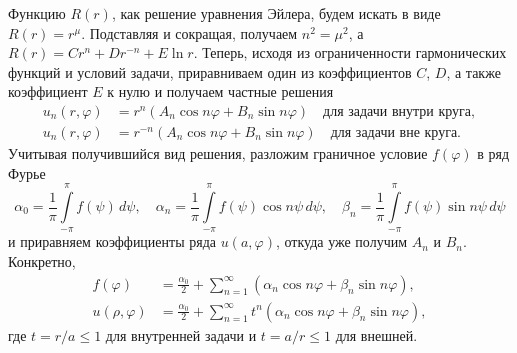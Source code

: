 Функцию $ R(r) $, как решение уравнения Эйлера, будем искать в виде $ R(r) = r^\mu $.
Подставляя и сокращая, получаем $ n^2 = \mu^2 $, а $ R(r) = Cr^n + Dr^{-n} +
E\ln r $.
Теперь, исходя из ограниченности гармонических функций и условий задачи, приравниваем один из
коэффициентов $ C $, $ D $, а также коэффициент $ E $ к нулю и получаем частные решения  
\begin{align*}
  u_n(r,\varphi) &= r^n(A_n\cos n\varphi + B_n \sin n\varphi) \quad \text{для
  задачи внутри круга},\\
    u_n(r,\varphi) &= r^{-n}(A_n\cos n\varphi + B_n \sin n\varphi) \quad \text{для
  задачи вне круга}.
\end{align*}
Учитывая получившийся вид решения, разложим граничное условие $ f(\varphi) $ в
ряд Фурье 
\begin{equation}
    \alpha_0 = \frac{1}{\pi}\int\limits_{-\pi}^{\pi}f(\psi)\,d\psi, \quad
    \alpha_n = \frac{1}{\pi}\int\limits_{-\pi}^{\pi}f(\psi)\cos
    n\psi\,d\psi,\quad
    \beta_n = \frac{1}{\pi}\int\limits_{-\pi}^{\pi}f(\psi)\sin n\psi\,d\psi
    \label{eq:fourier_exp}
\end{equation}
и приравняем коэффициенты ряда $ u(a, \varphi) $, откуда уже получим $ A_n $ и $ B_n $.
Конкретно, 
\begin{align}
  f(\varphi) &= \frac{\alpha_0}{2} + \sum_{n=1}^\infty(\alpha_n\cos n\varphi +
  \beta_n \sin n\varphi),\\
  u(\rho, \varphi) &= \frac{\alpha_0}{2} + \sum_{n=1}^\infty t^n (\alpha_n\cos
  n\varphi + \beta_n \sin n\varphi), \label{eq:fourier_sol}
\end{align}
где $ t = r/a \leqslant 1 $ для внутренней задачи и
$ t = a/r \leqslant 1 $ для внешней.




